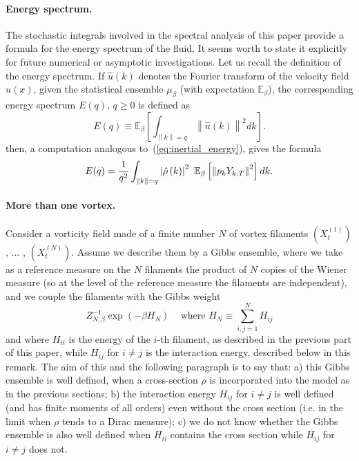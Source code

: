 \paragraph{Energy spectrum.}
The stochastic integrals involved in the spectral analysis of this paper
provide a formula for the energy spectrum of the fluid. It seems worth to
state it explicitly for future numerical or asymptotic investigations. Let
us recall the definition of the energy spectrum. If $\hat{u}\left(
  k\right)$ 
denotes the Fourier transform of the velocity field $u(x)$, 
given the statistical ensemble $\mu _{\beta }$ (with expectation $\mathbb{E}_{\beta }$), the
corresponding energy spectrum $E(q)$, $q\geq 0$  is defined
as 
\begin{equation*}
E(q) \equiv \mathbb{E}_{\beta }\left[ \int_{\left\| k \right\| = q}\left\| 
\hat{u}\left( k \right) \right\| ^{2}dk \right] .
\end{equation*}
then, a computation analogous to~(\ref{eq:inertial_energy}), gives the
formula
\begin{equation*}
E(q)=\frac{1}{q^{2}}\int_{\left\|k\right\| =q}\left| \hat{\rho}%
\left( k \right) \right| ^{2}\,\,\expect_{\beta }\left[ \left\| p_k
  Y_{k,T} \right\|^2 \right] dk.
\end{equation*}

\paragraph{More than one vortex.}
Consider a vorticity field made of a finite number $N$ of vortex
filaments $(X_{t}^{\left( 1\right) })$, ... , $(X_{t}^{\left( N\right) })$.
Assume we describe them by a Gibbs ensemble, where we take as a reference
measure on the $N$ filaments the product of $N$ copies of the Wiener measure
(so at the level of the reference measure the filaments are independent),
and we couple the filaments with the Gibbs weight 
\begin{equation*}
Z_{N,\beta }^{-1}\exp \left( -\beta H_{N}\right) \,\,\,\,\,\,\,\text{where }%
H_{N} \equiv \sum_{i,j=1}^{N}H_{ij}
\end{equation*}
and where $H_{ii}$ is the energy of the $i$-th filament, as described in the
previous part of this paper, while $H_{ij}$ for $i\neq j$ is the interaction
energy, described below in this remark. The aim of this and the following
paragraph is to say that: a) this Gibbs ensemble is well defined, when a
cross-section $\rho $ is incorporated into the model as in the previous
sections; b) the interaction energy $H_{ij}$ for $i\neq j$ is well defined
(and has finite moments of all orders) even without the cross section (i.e.
in the limit when $\rho $ tends to a Dirac measure); c) we do not know
whether the Gibbs ensemble is also well defined when $H_{ii}$ contains the
cross section while $H_{ij}$ for $i\neq j$ does not.

